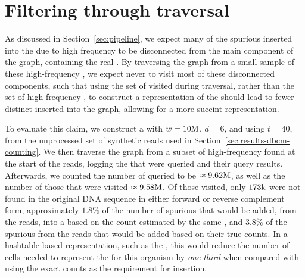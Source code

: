 \section{Filtering through traversal}
\label{sec:results-dbcm-traversal}

As discussed in Section~\ref{sec:pipeline}, we expect many of the spurious  inserted into the \dBG due to high frequency to be disconnected from the main component of the graph, containing the real . By traversing the graph from a small sample of these high-frequency , we expect never to visit most of these disconnected components, such that using the set of  visited during traversal, rather than the set of high-frequency , to construct a representation of the \dBG should lead to fewer distinct  inserted into the graph, allowing for a more succint representation.

To evaluate this claim, we construct a \dBCM with $w = 10\mega$, $d = 6$, and using $t = 40$, from the unprocessed set of synthetic reads used in Section~\ref{sec:results-dbcm-counting}. We then traverse the graph from a subset of high-frequency  found at the start of the reads, logging the  that were queried and their query results. Afterwards, we counted the number of queried  to be $\approx 9.62\mega$, as well as the number of those that were visited $\approx 9.58\mega$. Of those visited, only $173\kilo$ were not found in the original DNA sequence in either forward or reverse complement form, approximately $1.8\%$ of the number of spurious  that would be added, from the reads, into a \dBG based on the count estimated by the same \dBCM, and $3.8\%$ of the spurious  from the reads that would be added based on their true counts. In a hashtable-based representation, such as the \dBHT, this would reduce the number of cells needed to represent the \dBG for this organism by \emph{one third} when compared with using the exact counts as the requirement for insertion.


